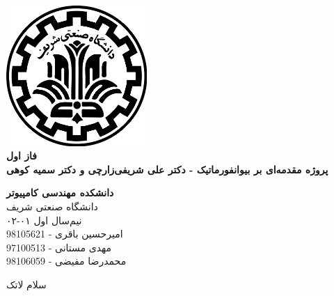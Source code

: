 \documentclass{article}
\begin{document}
\begin{titlepage}
	\begin{center}
		\vspace{0.2cm}
		
		\includegraphics[width=0.4\textwidth]{sharif.png}\\
		\vspace{0.5cm}
		\textbf{ \Huge{فاز اول}}\\
		\vspace{0.25cm}
		\textbf{ \Large{پروژه مقدمه‌ای بر بیوانفورماتیک - دکتر علی  شریفی‌زارچی و دکتر سمیه کوهی}}
		\vspace{0.2cm}
		
		
		\large \textbf{دانشکده مهندسی کامپیوتر}\\\vspace{0.1cm}
		\large   دانشگاه صنعتی شریف\\\vspace{0.2cm}
		\large   ﻧﯿﻢ‌سال اول ۰۱-۰۲ \\\vspace{0.2cm}
		\large{\Large{امیرحسین باقری - 98105621}}\\
		\large{\Large{مهدی مستانی - 97100513}}\\
		\large{\Large{محمدرضا مفیضی - 98106059}}\\
	\end{center}
\end{titlepage}

\newpage

\pagestyle{fancy}
\fancyhf{}
\fancyfoot{}
\setlength{\headheight}{59pt}
\cfoot{\thepage}

سلام لاتک
\end{document}
